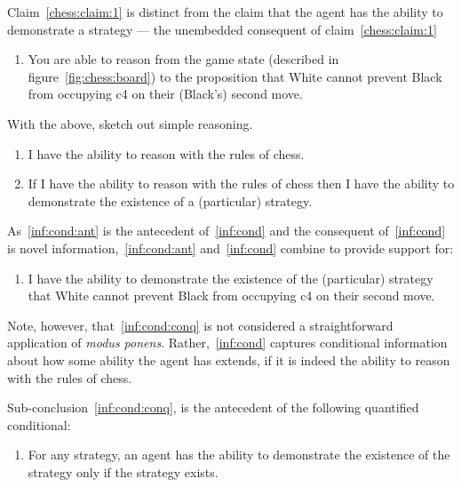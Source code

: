 \documentclass[10pt]{article}
\begin{document}
\begin{note}
  Claim~\ref{chess:claim:1} is distinct from the claim that the agent has the ability to demonstrate a strategy --- the unembedded consequent of claim~\ref{chess:claim:1}
\begin{enumerate}
\item\label{chess:claim:2}\label{chess:claim:1:conditional} You are able to reason from the game state (described in figure~\ref{fig:chess:board}) to the proposition that White cannot prevent Black from occupying c4 on their (Black's) second move.
\end{enumerate}
\end{note}

\begin{note}
  With the above, sketch out simple reasoning.
  \begin{enumerate}[label=(S\arabic*), ref=(S\arabic*)]
  \item\label{inf:cond:ant} I have the ability to reason with the rules of chess.
  \item\label{inf:cond} If I have the ability to reason with the rules of chess then I have the ability to demonstrate the existence of a (particular) strategy.
  \end{enumerate}

  As~\ref{inf:cond:ant} is the antecedent of~\ref{inf:cond} and the consequent of~\ref{inf:cond} is novel information,~\ref{inf:cond:ant} and~\ref{inf:cond} combine to provide support for:

  \begin{enumerate}[resume, label=(S\arabic*), ref=(S\arabic*)]
  \item\label{inf:cond:conq} I have the ability to demonstrate the existence of the (particular) strategy that White cannot prevent Black from occupying c4 on their second move.
  \end{enumerate}

  Note, however, that~\ref{inf:cond:conq} is not considered a straightforward application of \emph{modus ponens}.
  Rather,~\ref{inf:cond} captures conditional information about how some ability the agent has extends, if it is indeed the ability to reason with the rules of chess.

  Sub-conclusion~\ref{inf:cond:conq}, is the antecedent of the following quantified conditional:

  \begin{enumerate}[resume, label=(S\arabic*), ref=(S\arabic*)]
  \item\label{inf:gae} For any strategy, an agent has the ability to demonstrate the existence of the strategy only if the strategy exists.
  \end{enumerate}


\end{note}
\end{document}
